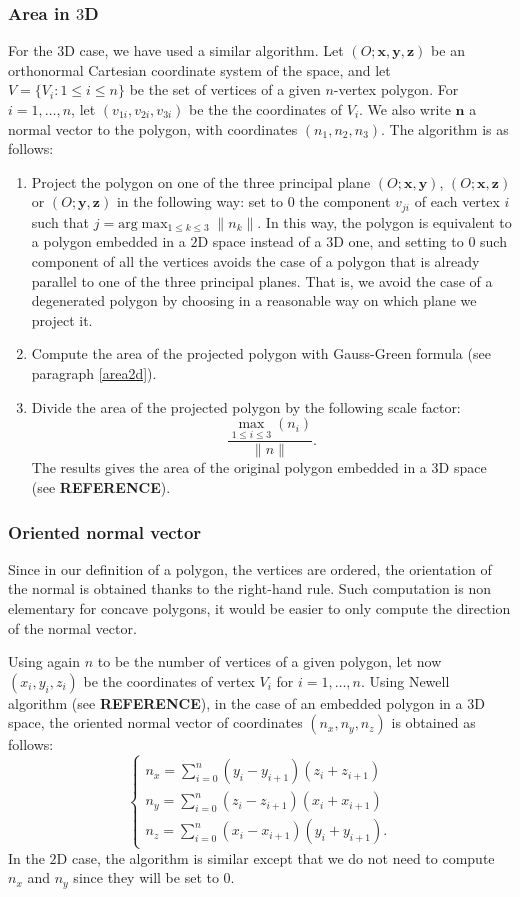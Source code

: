 \subsubsection{Area in $3$D}\label{area3d}
For the $3$D case, we have used a similar algorithm. Let $(O;\mathbf{x}, \mathbf{y}, \mathbf{z})$ be an orthonormal Cartesian coordinate system of the space, and let $V=\lbrace V_i : 1\leq i\leq n\rbrace$ be the set of vertices of a given $n$-vertex polygon. For $i=1,\ldots,n$, let $(v_{1i},v_{2i},v_{3i})$ be the the coordinates of $V_i$. We also write $\mathbf{n}$ a normal vector to the polygon, with coordinates $(n_1,n_2,n_3)$. The algorithm is as follows:
\begin{enumerate}
\item \label{pt1area3d} Project the polygon on one of the three principal plane $(O;\mathbf{x},\mathbf{y})$, $(O;\mathbf{x},\mathbf{z})$ or $(O;\mathbf{y},\mathbf{z})$ in the following way: set to $0$ the component $v_{ji}$ of each vertex $i$ such that $j=\text{arg} \max_{1\leq k \leq 3} \|n_k\|$. In this way, the polygon is equivalent to a polygon embedded in a $2$D space instead of a $3$D one, and setting to $0$ such component of all the vertices avoids the case of a polygon that is already parallel to one of the three principal planes. That is, we avoid the case of a degenerated polygon by choosing in a reasonable way on which plane we project it.  
\item Compute the area of the projected polygon with Gauss-Green formula (see paragraph \ref{area2d}). 
\item Divide the area of the projected polygon by the following scale factor: 
$$ \frac{\max_{1\leq i \leq 3}(n_i)}{\|n\|}. $$
The results gives the area of the original polygon embedded in a $3$D space (see \textbf{REFERENCE}).
\end{enumerate}

\subsubsection{Oriented normal vector}\label{onv}
Since in our definition of a polygon, the vertices are ordered, the orientation of the normal is obtained thanks to the right-hand rule. Such computation is non elementary for concave polygons, it would be easier to only compute the direction of the normal vector.

Using again $n$ to be the number of vertices of a given polygon, let now $(x_i,y_i,z_i)$ be the coordinates of vertex $V_i$ for $i=1,\ldots,n$. 
Using Newell algorithm (see \textbf{REFERENCE}), in the case of an embedded polygon in a $3$D space, the oriented normal vector of coordinates $(n_x,n_y,n_z)$ is obtained as follows:
$$
\begin{cases}
n_x=\sum_{i=0}^{n} (y_i-y_{i+1})(z_i+z_{i+1}) \\
n_y=\sum_{i=0}^{n} (z_i-z_{i+1})(x_i+x_{i+1}) \\
n_z=\sum_{i=0}^{n} (x_i-x_{i+1})(y_i+y_{i+1}). 
\end{cases}
$$
In the $2$D case, the algorithm is similar except that we do not need to compute $n_x$ and $n_y$ since they will be set to $0$. 

